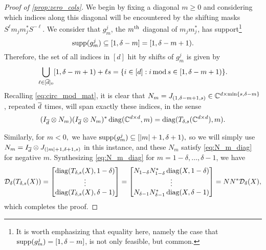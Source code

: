\begin{proof}[Proof of \cref{prop:zero_cols}]
  We begin by fixing a diagonal $m \ge 0$ and considering which indices along this diagonal will be encountered by the shifting masks $S^\ell m_j m_j^* S^{-\ell}$.  We consider that $g_m^j$, the $m^{\text{th}}$ diagonal of $m_j m_j^*$, has support\footnote{It is worth emphasizing that equality here, namely the case that $\operatorname{supp}(g_m^j) = [1, \delta - m]$, is not only feasible, but common.} \[\operatorname{supp}(g_m^j) \subseteq [1, \delta - m] = [1, \delta - m + 1).\]   Therefore, the set of all indices in $[d]$ hit by shifts of $g_m^j$ is given by \[\bigcup_{\ell \in [\overline{d}]_0} [1, \delta - m + 1) + \ell s = \{i \in [d] : i \operatorname{\mathbin{mod}} s \in [1, \delta - m + 1)\}.\]  Recalling \eqref{eq:circ_mod_mat}, it is clear that $N_m = J_{(1, \delta - m + 1, s)} \in \mathbb{C}^{d \times \min\{s, \delta - m\}}$, repeated $\overline{d}$ times, will span exactly these indices, in the sense \begin{equation} \label{eq:N_m_diag} (I_{\overline{d}} \otimes N_m) (I_{\overline{d}} \otimes N_m)^* \operatorname{diag}(\mathbb{C}^{d \times d}, m) = \operatorname{diag}(T_{\delta, s}(\mathbb{C}^{d \times d}), m). \end{equation}

  Similarly, for $m < 0,$ we have $\operatorname{supp}(g_m^j) \subseteq [\lvert m\rvert + 1, \delta + 1),$ so we will simply use $N_m = I_{\overline{d}} \otimes J_{(\lvert m\rvert + 1, \delta + 1, s)}$ in this instance, and these $N_m$ satisfy \eqref{eq:N_m_diag} for negative $m$.  Synthesizing \eqref{eq:N_m_diag} for $m = 1 - \delta, \ldots, \delta - 1$, we have \[\mathcal{D}_\delta(T_{\delta, s}(X)) = \begin{bmatrix} \operatorname{diag}(T_{\delta, s}(X), 1 - \delta) \\ \vdots \\ \operatorname{diag}(T_{\delta, s}(X), \delta - 1) \end{bmatrix} = \begin{bmatrix} N_{1 - \delta} N_{1 - \delta}^* \operatorname{diag}(X, 1 - \delta) \\ \vdots \\ N_{\delta - 1} N_{\delta - 1}^* \operatorname{diag}(X, \delta - 1) \end{bmatrix} = N N^* \mathcal{D}_\delta(X),\] which completes the proof.
\end{proof}

